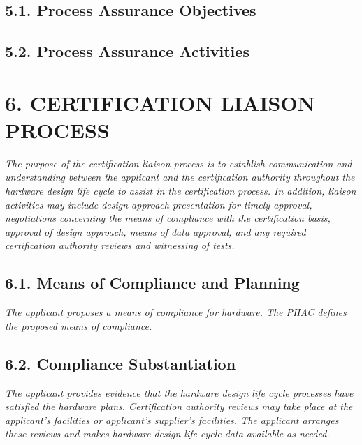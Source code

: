 \documentclass[
]{article}
\begin{document}
\hypertarget{process-assurance-objectives}{%
\subsection{5.1. Process Assurance
Objectives}\label{process-assurance-objectives}}

\hypertarget{process-assurance-activities}{%
\subsection{5.2. Process Assurance
Activities}\label{process-assurance-activities}}

\hypertarget{certification-liaison-process}{%
\section{6. CERTIFICATION LIAISON
PROCESS}\label{certification-liaison-process}}

\emph{The purpose of the certification liaison process is to establish
communication and understanding between the applicant and the
certification authority throughout the hardware design life cycle to
assist in the certification process. In addition, liaison activities may
include design approach presentation for timely approval, negotiations
concerning the means of compliance with the certification basis,
approval of design approach, means of data approval, and any required
certification authority reviews and witnessing of tests.}

\hypertarget{means-of-compliance-and-planning}{%
\subsection{6.1. Means of Compliance and
Planning}\label{means-of-compliance-and-planning}}

\emph{The applicant proposes a means of compliance for hardware. The
PHAC defines the proposed means of compliance.}

\hypertarget{compliance-substantiation}{%
\subsection{6.2. Compliance
Substantiation}\label{compliance-substantiation}}

\emph{The applicant provides evidence that the hardware design life
cycle processes have satisfied the hardware plans. Certification
authority reviews may take place at the applicant's facilities or
applicant's supplier's facilities. The applicant arranges these reviews
and makes hardware design life cycle data available as needed.}
\end{document}
